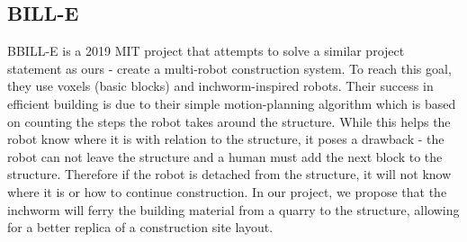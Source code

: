 \subsection{BILL-E}
BBILL-E is a 2019 MIT project that attempts to solve a similar project statement as ours - create a multi-robot construction system. To reach this goal, they use voxels (basic blocks) and inchworm-inspired robots. Their success in efficient building is due to their simple motion-planning algorithm which is based on counting the steps the robot takes around the structure. While this helps the robot know where it is with relation to the structure, it poses a drawback - the robot can not leave the structure and a human must add the next block to the structure. Therefore if the robot is detached from the structure, it will not know where it is or how to continue construction. In our project, we propose that the inchworm will ferry the building material from a quarry to the structure, allowing for a better replica of a construction site layout. \cite{BillE}